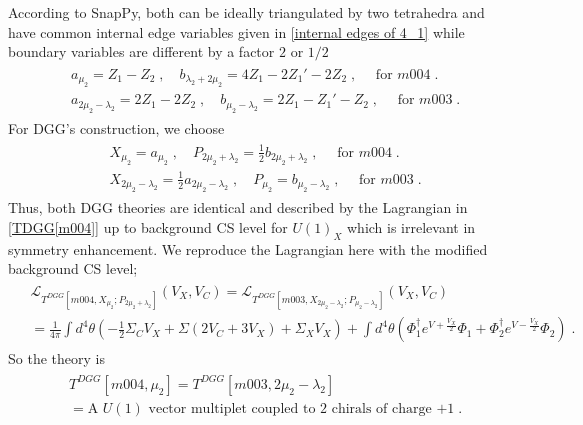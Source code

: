 \documentclass[a4paper,11pt]{article}
\begin{document}
According to SnapPy, both can be ideally triangulated by two tetrahedra and  have common internal edge variables given in \eqref{internal edges of 4_1} while boundary variables are different by a factor $2$ or $1/2$
%
\begin{align}
\begin{split}
& a_{\mu_2} = Z_1-Z_2\;, \quad  b_{\lambda_2+2 \mu_2} = 4Z_1-2Z_1'-2Z_2\;,  \quad \textrm{ for $m004$}\;. 
\\
& a_{2\mu_2-\lambda_2}= 2 Z_1-2 Z_2\;, \quad b_{\mu_2 -\lambda_2} = 2Z_1-Z_1'-Z_2\;,   \quad \textrm{ for $m003$}\;. 
\end{split}
\end{align}
%
For DGG's construction, we choose
%
\begin{align}
\begin{split}
& X_{\mu_2}= a_{\mu_2}\;, \quad P_{2\mu_2+\lambda_2}=\frac{1}2 b_{2\mu_2+\lambda_2} \;,   \quad \textrm{ for $m004$}\;. 
\\
& X_{2\mu_2-\lambda_2}= \frac{1}2 a_{2\mu_2-\lambda_2}\;, \quad P_{\mu_2}= b_{\mu_2-\lambda_2} \;,   \quad \textrm{ for $m003$}\;. 
\end{split}
\end{align}
%
Thus, both DGG theories are identical and described by the Lagrangian in \eqref{TDGG[m004]} up to background CS level for $U(1)_{X}$ which is irrelevant in symmetry enhancement.
We reproduce the Lagrangian here with the modified background CS level;
%
\begin{align}
\begin{split}
&\mathcal{L}_{T^{DGG}[m004, X_{\mu_2} ;P_{2 \mu_2 +\lambda_2}]} (V_{X}, V_C)  = \mathcal{L}_{T^{DGG}[m003, X_{2\mu_2-\lambda_2} ;P_{\mu_2-\lambda_2}]} (V_{X}, V_C) 
\\
&=\frac{1}{4\pi} \int d^4 \theta \left(- \frac{1}2 \Sigma_C V_X + \Sigma (2V_C + 3 V_X) + \Sigma_X V_X \right) + \int d^4 \theta \left( \Phi_1^\dagger e^{V+\frac{V_X}2}\Phi_1 +\Phi_2^\dagger e^{V- \frac{V_X}2}\Phi_2 \right) \;.\label{TDGG[m004]reproduced}
\end{split}
\end{align}
%  
So the theory is 
%
\begin{align}
\begin{split}
&T^{DGG}[m004,\mu_2] = T^{DGG}[m003,2\mu_2- \lambda_2] 
\\
&=\textrm{A $U(1)$  vector multiplet coupled to 2 chirals of charge $+1$} \;.
\end{split}
\end{align}
%
\end{document}
